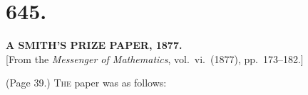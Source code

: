 \documentclass[11pt,a4paper]{article}
\begin{document}
\bigskip


\section*{645.}

\begin{center}
\textbf{A SMITH'S PRIZE PAPER, 1877.}\\[1em]
[From the \textit{Messenger of Mathematics}, vol.~vi.\ (1877), pp.\ 173--182.]
\end{center}

\medskip

\noindent (Page 39.) \textsc{The} paper was as follows:
\end{document}
